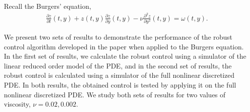 \documentclass[10pt,a4paper]{amsart}
\newcommand{\R}{\mathbb{R}}
\newcommand{\ud}{\mathrm{d}}
\newcommand{\todo}[1]{{\color{blue} #1}}
\begin{document}
Recall the Burgers' equation, 
\begin{align*}
\frac{\partial z}{\partial t}(t,y) + z(t,y) \frac{\partial z}{\partial y}(t,y) - \nu \frac{\partial^2 z}{\partial y^2}(t,y) = \omega(t,y).
\end{align*}



We present two sets of results to demonstrate the performance of the robust control algorithm developed in the paper when applied to the Burgers equation. In the first set of results, we calculate the robust control using a simulator of the linear reduced order model of the PDE, and in the second set of results, the robust control is calculated using a simulator of the full nonlinear discretized PDE. In both results, the obtained control is tested by applying it on the full nonlinear discretized PDE. We study both sets of results for two values of viscosity, $\nu = 0.02,0.002$.
\end{document}
